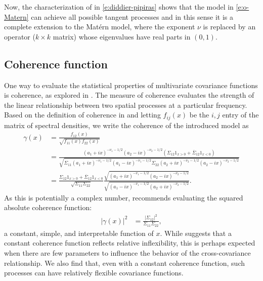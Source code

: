 \documentclass[11pt]{article}
\begin{document}
   Now, the characterization of \cite{didier_integral_2011} in \eqref{e:diddier-pipiras} shows that the model in \eqref{e:o-Matern} can achieve all possible tangent processes and in this sense it is a complete extension to the Mat\'ern model, where the exponent $\nu$ is replaced by an operator ($k\times k$ matrix) whose eigenvalues have real parts in $(0,1)$.


\subsection{Coherence function}
One way to evaluate the statistical properties of multivariate covariance functions is coherence, as explored in \cite{kleiber_coherence_2018}. 
The measure of coherence evaluates the strength of the linear relationship between two spatial processes at a particular frequency. 
Based on the definition of coherence in \cite{kleiber_coherence_2018} and letting $f_{ij}(x)$ be the $i,j$ entry of the matrix of spectral densities, we write the coherence of the introduced model as \begin{align*}
\gamma(x) &= \frac{f_{12}(x)}{\sqrt{f_{11}(x) f_{22}(x)}} \\ %
&=\frac{(a_1 + ix)^{-\nu_1 - 1/2}(a_2 - ix)^{-\nu_2 - 1/2}(\Sigma_{12}1_{x > 0} + \overline{\Sigma}_{12}1_{x < 0})}{\sqrt{\Sigma_{11}(a_1+ ix)^{-\nu_1 - 1/2}(a_1 - ix)^{-\nu_1 - 1/2}\Sigma_{22}(a_2 +ix)^{-\nu_2 - 1/2}(a_2 -ix)^{-\nu_2 - 1/2}}}\\
&=\frac{\Sigma_{12}1_{x > 0} + \overline{\Sigma}_{12}1_{x < 0}}{\sqrt{\Sigma_{11}\Sigma_{22}}}\frac{\sqrt{(a_1 + ix)^{-\nu_1 - 1/2}(a_2 -ix)^{-\nu_2 - 1/2}}}{\sqrt{(a_1 - ix)^{-\nu_1 - 1/2}(a_2 +ix)^{-\nu_2 - 1/2}}}.
\end{align*}As this is potentially a complex number, \cite{kleiber_coherence_2018} recommends evaluating the squared absolute coherence function: \begin{align*}
|\gamma(x)|^2&= \frac{|\Sigma_{12}|^2}{\Sigma_{11}\Sigma_{22}},
\end{align*}a constant, simple, and interpretable function of $x$. While \cite{kleiber_coherence_2018} suggests that a constant coherence function reflects relative inflexibility, this is perhaps expected when there are few parameters to influence the behavior of the cross-covariance relationship. We also find that, even with a constant coherence function, such processes can have relatively flexible covariance functions. 
\end{document}
